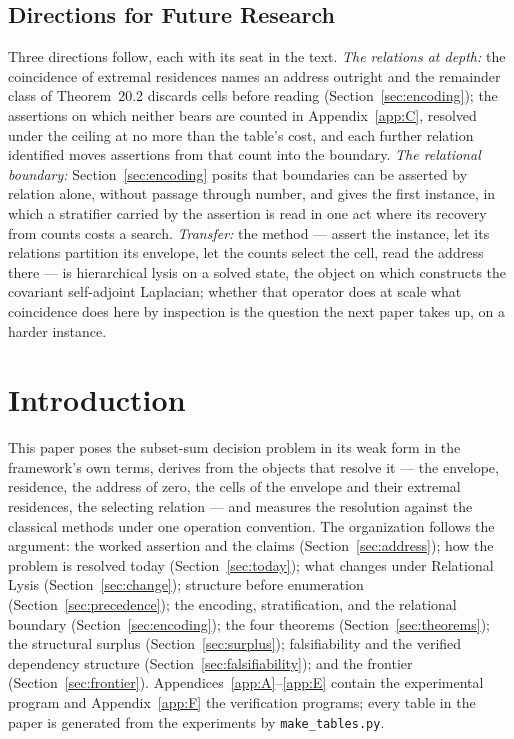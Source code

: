 \documentclass[pdflatex,sn-mathphys-num]{sn-jnl}
\theoremstyle{thmstyleone}%
\theoremstyle{thmstyletwo}%
\theoremstyle{thmstylethree}%
\newcommand{\PA}{\cite{Swanagon2026PA}}
\begin{document}
\subsection*{Directions for Future Research}
Three directions follow, each with its seat in the text. \emph{The relations at depth:} the coincidence of extremal residences names an address outright and the remainder class of Theorem~20.2 discards cells before reading (Section~\ref{sec:encoding}); the assertions on which neither bears are counted in Appendix~\ref{app:C}, resolved under the ceiling at no more than the table's cost, and each further relation identified moves assertions from that count into the boundary. \emph{The relational boundary:} Section~\ref{sec:encoding} posits that boundaries can be asserted by relation alone, without passage through number, and gives the first instance, in which a stratifier carried by the assertion is read in one act where its recovery from counts costs a search. \emph{Transfer:} the method --- assert the instance, let its relations partition its envelope, let the counts select the cell, read the address there --- is hierarchical lysis on a solved state, the object on which \cite{Swanagon2026YangMills} constructs the covariant self-adjoint Laplacian; whether that operator does at scale what coincidence does here by inspection is the question the next paper takes up, on a harder instance.

\section*{Introduction}\label{sec:intro}
This paper poses the subset-sum decision problem in its weak form in the framework's own terms, derives from \PA{} the objects that resolve it --- the envelope, residence, the address of zero, the cells of the envelope and their extremal residences, the selecting relation --- and measures the resolution against the classical methods under one operation convention. The organization follows the argument: the worked assertion and the claims (Section~\ref{sec:address}); how the problem is resolved today (Section~\ref{sec:today}); what changes under Relational Lysis (Section~\ref{sec:change}); structure before enumeration (Section~\ref{sec:precedence}); the encoding, stratification, and the relational boundary (Section~\ref{sec:encoding}); the four theorems (Section~\ref{sec:theorems}); the structural surplus (Section~\ref{sec:surplus}); falsifiability and the verified dependency structure (Section~\ref{sec:falsifiability}); and the frontier (Section~\ref{sec:frontier}). Appendices~\ref{app:A}--\ref{app:E} contain the experimental program and Appendix~\ref{app:F} the verification programs; every table in the paper is generated from the experiments by \texttt{make\_tables.py}.
\end{document}
